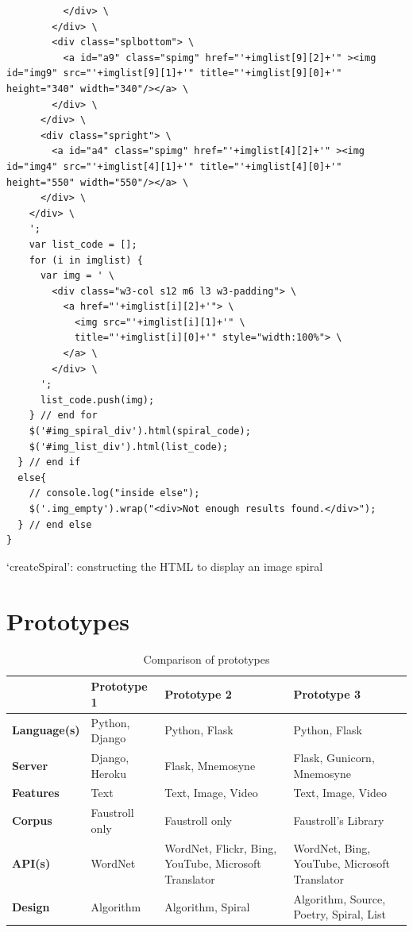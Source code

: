 \begin{listing}
\begin{verbatim}
          </div> \
        </div> \
        <div class="splbottom"> \
          <a id="a9" class="spimg" href="'+imglist[9][2]+'" ><img id="img9" src="'+imglist[9][1]+'" title="'+imglist[9][0]+'" height="340" width="340"/></a> \
        </div> \
      </div> \
      <div class="spright"> \
        <a id="a4" class="spimg" href="'+imglist[4][2]+'" ><img id="img4" src="'+imglist[4][1]+'" title="'+imglist[4][0]+'" height="550" width="550"/></a> \
      </div> \
    </div> \
    ';
    var list_code = [];
    for (i in imglist) {
      var img = ' \
        <div class="w3-col s12 m6 l3 w3-padding"> \
          <a href="'+imglist[i][2]+'"> \
            <img src="'+imglist[i][1]+'" \
            title="'+imglist[i][0]+'" style="width:100%"> \
          </a> \
        </div> \
      ';
      list_code.push(img);
    } // end for
    $('#img_spiral_div').html(spiral_code);
    $('#img_list_div').html(list_code);
  } // end if
  else{
    // console.log("inside else");
    $('.img_empty').wrap("<div>Not enough results found.</div>");
  } // end else
}
  \end{verbatim}
\caption[`createSpiral' function]{`createSpiral': constructing the HTML to display an image spiral}
\label{code:createSpiral}
\end{listing}


\section{Prototypes}

\begin{table}[!htbp]
\caption{Comparison of prototypes}
\label{tab:Compproto}
\centering
\begin{tabu}{X[2]X[2]X[3]X[3]}
\toprule
&
\textbf{Prototype 1}
&
\textbf{Prototype 2}
&
\textbf{Prototype 3}
\\ \midrule
\textbf{Language(s)}
&
Python, Django & Python, Flask
&
Python, Flask
\\
\textbf{Server}
&
Django, Heroku & Flask, Mnemosyne
&
Flask, Gunicorn, Mnemosyne
\\
\textbf{Features}
&
Text
&
Text, Image, Video
&
Text, Image, Video
\\
\textbf{Corpus}
&
Faustroll only
&
Faustroll only
&
Faustroll's Library
\\
\textbf{API(s)}
&
WordNet
&
WordNet, Flickr, Bing, YouTube, Microsoft Translator
&
WordNet, Bing, YouTube, Microsoft Translator
\\
\textbf{Design}
&
Algorithm
&
Algorithm, Spiral
&
Algorithm, Source, Poetry, Spiral, List
\\ \bottomrule
\end{tabu}
\end{table}

